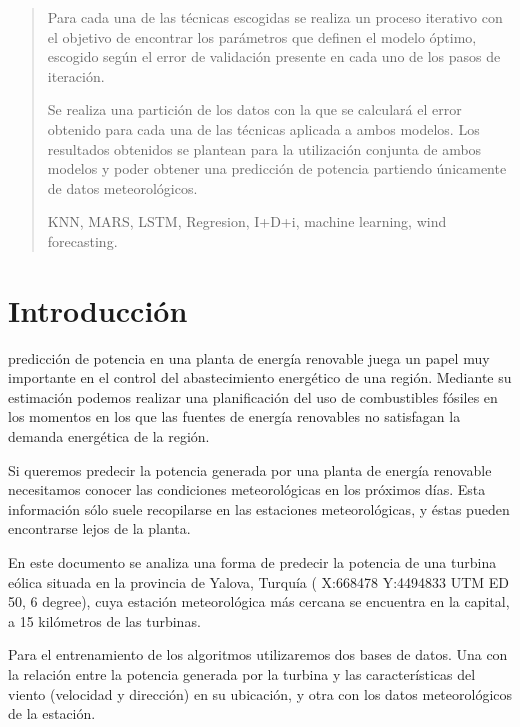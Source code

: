 \documentclass[journal]{IEEEtran}
\begin{document}
\begin{abstract}
Para cada una de las técnicas escogidas se realiza un proceso iterativo con el objetivo de encontrar los parámetros que definen el modelo óptimo, escogido según el error de validación presente en cada uno de los pasos de iteración. 

Se realiza una partición de los datos con la que se calculará el error obtenido para cada una de las técnicas aplicada a ambos modelos. Los resultados obtenidos se plantean para la utilización conjunta de ambos modelos y poder obtener una predicción de potencia partiendo únicamente de datos meteorológicos.

\begin{IEEEkeywords}
KNN, MARS, LSTM, Regresion, I+D+i, machine learning, wind forecasting.
\end{IEEEkeywords}


\end{abstract}



\IEEEpeerreviewmaketitle



\section{Introducción}
 predicción de potencia en una planta de energía renovable juega un papel muy importante en el control del abastecimiento energético de una región. Mediante su estimación podemos realizar una planificación del uso de combustibles fósiles en los momentos en los que las fuentes de energía renovables no satisfagan la demanda energética de la región.

 Si queremos predecir la potencia generada por una planta de energía renovable necesitamos conocer las condiciones meteorológicas en los próximos días. Esta información sólo suele recopilarse en las estaciones meteorológicas, y éstas pueden encontrarse lejos de la planta. 


En este documento se analiza una forma de predecir la potencia de una turbina eólica situada en la provincia de Yalova, Turquía ( X:668478 Y:4494833 UTM ED 50, 6 degree), cuya estación meteorológica más cercana se encuentra en la capital, a 15 kilómetros de las turbinas.

Para el entrenamiento de los algoritmos utilizaremos dos bases de datos. Una con la relación entre la potencia generada por la turbina y las características del viento (velocidad y dirección) en su ubicación, y otra con los datos meteorológicos de la estación.
\end{document}
